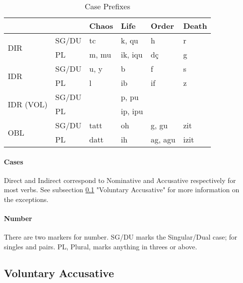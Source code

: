 \documentclass[11pt]{article}
\begin{document}
\begin{table}[H]
\begin{center}
\caption{Case Prefixes}
\label{table-cases}
\begin{tabular}{llllll}
                            &           & \textbf{Chaos} & \textbf{Life} & \textbf{Order} & \textbf{Death} \\
\hline\hline
\multirow{2}{*}{DIR}        & SG/DU     & tc             & k, qu         & h              & r              \\
                            & PL        & m, mu          & ik, iqu       & dç             & g              \\
\hline
\multirow{2}{*}{IDR}                 & SG/DU     & u, y           & b             & f              & s              \\
                            & PL        & l              & ib            & if             & z              \\
\hline
\multirow{2}{*}{IDR (VOL)}  & SG/DU     &                & p, pu         &                &                \\
                            & PL        &                & ip, ipu       &                &                \\
\hline
\multirow{2}{*}{OBL}        & SG/DU     & tatt           & oh            & g, gu          & zit            \\
                            & PL        & datt           & ih            & ag, agu        & izit          
\end{tabular}
\end{center}
\end{table}

\paragraph{Cases}
Direct and Indirect correspond to Nominative and Accusative respectively for most verbs.
See subsection \ref{sec:voluntary} "Voluntary Accusative" for more information on the exceptions.

\paragraph{Number}
There are two markers for number. SG/DU marks the Singular/Dual case;
for singles and pairs. PL, Plural, marks anything in threes or above.

\subsection{Voluntary Accusative} \label{sec:voluntary}
\end{document}

